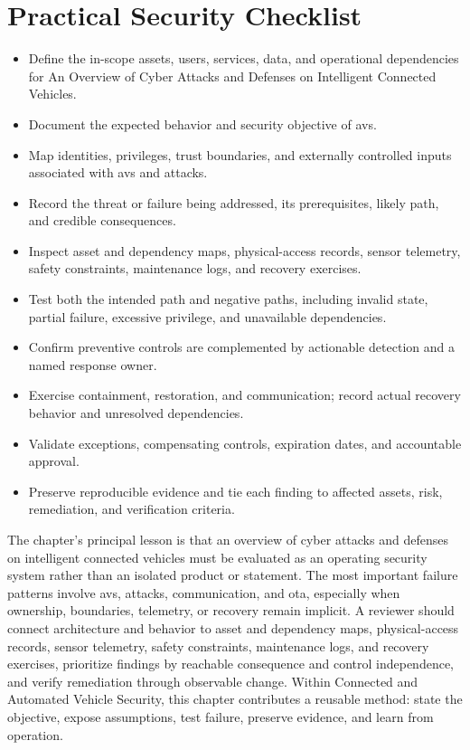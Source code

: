 \documentclass[11pt]{article}
\begin{document}
\section*{Practical Security Checklist}
\begin{itemize}[label=$\square$]
\item Define the in-scope assets, users, services, data, and operational dependencies for An Overview of Cyber Attacks and Defenses on Intelligent Connected Vehicles.
\item Document the expected behavior and security objective of avs.
\item Map identities, privileges, trust boundaries, and externally controlled inputs associated with avs and attacks.
\item Record the threat or failure being addressed, its prerequisites, likely path, and credible consequences.
\item Inspect asset and dependency maps, physical-access records, sensor telemetry, safety constraints, maintenance logs, and recovery exercises.
\item Test both the intended path and negative paths, including invalid state, partial failure, excessive privilege, and unavailable dependencies.
\item Confirm preventive controls are complemented by actionable detection and a named response owner.
\item Exercise containment, restoration, and communication; record actual recovery behavior and unresolved dependencies.
\item Validate exceptions, compensating controls, expiration dates, and accountable approval.
\item Preserve reproducible evidence and tie each finding to affected assets, risk, remediation, and verification criteria.
\end{itemize}
\begin{synthesisbox}
The chapter's principal lesson is that an overview of cyber attacks and defenses on intelligent connected vehicles must be evaluated as an operating security system rather than an isolated product or statement. The most important failure patterns involve avs, attacks, communication, and ota, especially when ownership, boundaries, telemetry, or recovery remain implicit. A reviewer should connect architecture and behavior to asset and dependency maps, physical-access records, sensor telemetry, safety constraints, maintenance logs, and recovery exercises, prioritize findings by reachable consequence and control independence, and verify remediation through observable change. Within Connected and Automated Vehicle Security, this chapter contributes a reusable method: state the objective, expose assumptions, test failure, preserve evidence, and learn from operation.
\end{synthesisbox}
\end{document}
